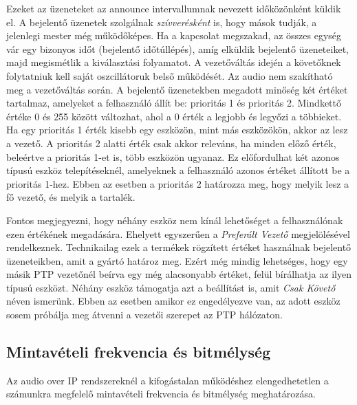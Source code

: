 Ezeket az üzeneteket az announce intervallumnak nevezett időközönként küldik el. 
A bejelentő üzenetek szolgálnak \textit{szívverésként} is, hogy mások tudják, a jelenlegi mester még működőképes.
Ha a kapcsolat megszakad, az összes egység vár egy bizonyos időt (bejelentő időtúllépés),
amíg elküldik bejelentő üzeneteiket, majd megismétlik a kiválasztási folyamatot. 
A vezetőváltás idején a követőknek folytatniuk kell saját oszcillátoruk belső működését.
Az audio nem szakítható meg a vezetőváltás során.
A bejelentő üzenetekben megadott minőség két értéket tartalmaz, amelyeket a felhasználó állít be: prioritás 1 és prioritás 2.
Mindkettő értéke 0 és 255 között változhat, ahol a 0 érték a legjobb és legyőzi a többieket.
Ha egy prioritás 1 érték kisebb egy eszközön, mint más eszközökön,
akkor az lesz a vezető. A prioritás 2 alatti érték csak akkor releváns, ha
minden előző érték, beleértve a prioritás 1-et is, több eszközön ugyanaz. 
Ez előfordulhat két azonos típusú eszköz telepítéseknél, amelyeknek a felhasználó
azonos értéket állított be a prioritás 1-hez. Ebben az esetben a prioritás 2
határozza meg, hogy melyik lesz a fő vezető, és melyik a tartalék. 

Fontos megjegyezni, hogy néhány eszköz nem kínál lehetőséget a felhasználónak ezen értékének megadására.
Ehelyett egyszerűen a \textit{Preferált Vezető} megjelölésével rendelkeznek.
Technikailag ezek a termékek rögzített értéket használnak bejelentő üzeneteikben, amit a gyártó határoz meg.
Ezért még mindig lehetséges, hogy egy másik PTP vezetőnél beírva egy még alacsonyabb értéket, felül bírálhatja az ilyen típusú eszközt.
Néhány eszköz támogatja azt a beállítást is, amit \textit{Csak Követő} néven ismerünk. Ebben az esetben amikor ez engedélyezve van,
az adott eszköz sosem próbálja meg átvenni a vezetői szerepet az PTP hálózaton.
\subsection{Mintavételi frekvencia és bitmélység}
Az audio over IP rendszereknél a kifogástalan működéshez elengedhetetlen a számunkra
megfelelő mintavételi frekvencia és bitmélység meghatározása.

